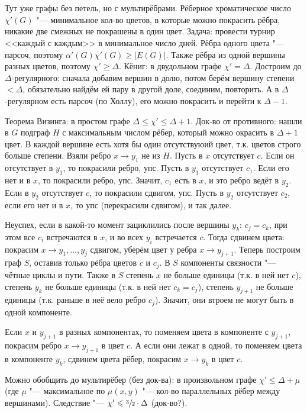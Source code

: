 \section{} %
	Тут уже графы без петель, но с мультирёбрами.
	Рёберное хроматическое число $\chi'(G)$ "--- минимальное кол-во цветов, в которые можно покрасить рёбра,
	никакие две смежных не покрашены в один цвет.
	Задача: провести турнир <<каждый с каждым>> в минимальное число дней.
	Рёбра одного цвета "--- парсоч, поэтому $\alpha'(G)\chi'(G) \ge |E(G)|$.
	Также рёбра из одной вершины разных цветов, поэтому $\chi' \ge \Delta$.
	Кёниг: в двудольном графе $\chi' = \Delta$.
	Достроим до $\Delta$-регулярного: сначала добавим вершин в долю, потом берём вершину степени $<\Delta$,
	обязательно найдём ей пару в другой доле, соединим, повторить.
	А в $\Delta$-регулярном есть парсоч (по Холлу), его можно покрасить и перейти к $\Delta-1$.

	Теорема Визинга: в простом графе $\Delta \le \chi' \le \Delta + 1$.
	Док-во от противного: нашли в $G$ подграф $H$ с максимальным числом рёбер, который можно окрасить в $\Delta+1$ цвет.
	В каждой вершине есть хотя бы один отсутствуюий цвет, т.к. цветов строго больше степени.
	Взяли ребро $x\to y_1$ не из $H$.
	Пусть в $x$ отсутствует $c$.
	Если он отсутствует в $y_1$, то покрасили ребро, упс.
	Пусть в $y_1$ отсутствует $c_1$.
	Если его нет и в $x$, то покрасили ребро, упс.
	Значит, $c_1$ есть в $x$, и это ребро ведёт в $y_2$.
	Если в $y_2$ отсутствует $c$, то покрасили сдвигом, упс.
	Пусть в $y_2$ отсутствует $c_2$, если его нет и в $x$, то упс (перекрасили сдвигом), и так далее.

	Неуспех, если в какой-то момент зациклились после вершины $y_k$: $c_j=c_k$, при этом все $c_i$ встречаются в $x$, и во всех $y_i$ встречается $c$.
	Тогда сдвинем цвета: покрасим $x \to y_1, \dots, y_{j}$ сдвигом, уберём цвет у ребра $x \to y_{j+1}$.
	Теперь построим граф $S$, оставив только рёбра цветов $c$ и $c_j$.
	В $S$ компоненты связности "--- чётные циклы и пути.
	Также в $S$ степень $x$ не больше единицы (т.к. в ней нет $c$), степень $y_k$ не больше единицы (т.к. в ней нет $c_k=c_j$),
	степень $y_{j+1}$ не больше единицы (т.к. раньше в неё вело ребро $c_j$).
	Значит, они втроем не могут быть в одной компоненте.

	Если $x$ и $y_{j+1}$ в разных компонентах, то поменяем цвета в компоненте с $y_{j+1}$, покрасим ребро $x\to y_{j+1}$ в цвет $c$.
	А если они лежат в одной, то поменяем цвета в компоненте $y_k$, сдвинем цвета рёбер, покрасим $x \to y_k$ в цвет $c$.

	Можно обобщить до мультирёбер (без док-ва): в произвольном графе $\chi' \le \Delta + \mu$ (где $\mu$ "--- максимальное по $\mu(x, y)$ "--- кол-во параллельных рёбер между вершинами).
	Следствие "--- $\chi' \leqslant \sfrac 32 \cdot \Delta$ (\TODO док-во?).

\section{} %
	
